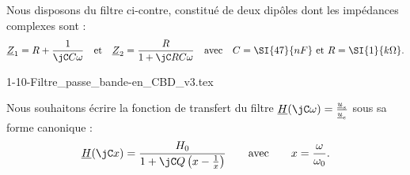 \hauteurLargeurCadreReponse		{6mm}{3.25cm}
\initialisationEntrainement


%
\initialisationPartieGauche %
Nous disposons du filtre ci-contre, constitué de deux dipôles dont les impédances complexes sont :
\[
\underline{Z}_1=R+\frac{1}{\jC C \omega} \quad \text{et} \quad
\underline{Z}_2=\frac{R}{1+\jC RC \omega} \quad \text{avec} \quad C=\SI{47}{nF}  \text{ et }  R=\SI{1}{k\Omega}.
\]

\initialisationPartieDroite %
\begin{center}
	{1-10-Filtre_passe_bande-en_CBD_v3.tex}	
\end{center}
\finalisationDuPartageDePage %

Nous souhaitons écrire la fonction de transfert du filtre $\underline{H}(\jC \omega) = \frac{\underline{u}_s}{\underline{u}_e}$ sous sa forme canonique :\minusSmallskip
\[
\underline{H}(\jC x)=\frac{H_0}{1+\jC Q\left(x-\frac{1}{x}\right)} \qquad \text{avec} \qquad x=\frac{\omega}{\omega_0}.
\]

\smallskip

\debutEntrainement


